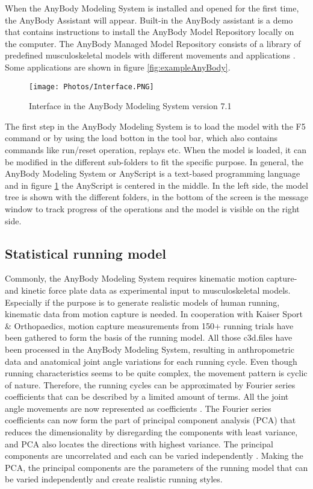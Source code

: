     When the AnyBody Modeling System is installed and opened for the first time, the AnyBody Assistant will appear. Built-in the AnyBody assistant is a demo that contains instructions to install the AnyBody Model Repository locally on the computer. The AnyBody Managed Model Repository consists of a library of predefined musculoskeletal models with different movements and applications \parencite{Lund2018}. Some applications are shown in figure \ref{fig:exampleAnyBody}. 
    
    \vspace{.5cm}
    \begin{figure}[h!]
        \centering
        \texttt{[image: Photos/Interface.PNG]}
        \caption{Interface in the AnyBody Modeling System version 7.1}
        \label{fig:interface}
    \end{figure}
    \vspace{.5cm}
    
    The first step in the AnyBody Modeling System is to load the model with the F5 command or by using the load botton in the tool bar, which also contains commands like run/reset operation, replays etc. When the model is loaded, it can be modified in the different sub-folders to fit the specific purpose. In general, the AnyBody Modeling System or AnyScript is a text-based programming language and in figure \ref{fig:interface} the AnyScript is centered in the middle. In the left side, the model tree is shown with the different folders, in the bottom of the screen is the message window to track progress of the operations and the model is visible on the right side. 

    \subsection{Statistical running model}
        Commonly, the AnyBody Modeling System requires kinematic motion capture- and kinetic force plate data as experimental input to musculoskeletal models. Especially if the purpose is to generate realistic models of human running, kinematic data from motion capture is needed. In cooperation with Kaiser Sport \& Orthopaedics, motion capture measurements from 150+ running trials have been gathered to form the basis of the running model. All those c3d.files have been processed in the AnyBody Modeling System, resulting in anthropometric data and anatomical joint angle variations for each running cycle. Even though running characteristics seems to be quite complex, the movement pattern is cyclic of nature. Therefore, the running cycles can be approximated by Fourier series coefficients that can be described by a limited amount of terms. All the joint angle movements are now represented as coefficients \parencite{Rasmussen2019}. The Fourier series coefficients can now form the part of principal component analysis (PCA) that reduces the dimensionality by disregarding the components with least variance, and PCA also locates the directions with highest variance. The principal components are uncorrelated and each can be varied independently \parencite{Holland2016, Moeslund2001}. Making the PCA, the principal components are the parameters of the running model that can be varied independently and create realistic running styles. 
    
